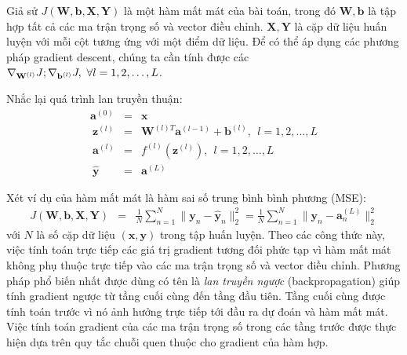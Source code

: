 

Giả sử $J(\mathbf{W, b, X, Y})$ là một hàm mất mát của bài toán, trong đó
$\mathbf{W, b}$ là tập hợp tất cả các ma trận trọng số và vector điều chỉnh. $\mathbf{X, Y}$ là cặp dữ liệu huấn luyện với mỗi cột
tương ứng với một điểm dữ liệu. Để có thể áp dụng các phương pháp gradient descent,
chúng ta cần tính được các
\begin{math}
\nabla_{\mathbf{W}^{(l)}}J; \nabla_{\mathbf{b}^{(l)}}J, ~\forall l = 1, 2, \dots, L
\end{math}.

Nhắc lại quá trình lan truyền thuận:
\begin{eqnarray}
\mathbf{a}^{(0)} &=& \mathbf{x} \\\
\mathbf{z}^{(l)}  &=& \mathbf{W}^{(l)T}\mathbf{a}^{(l-1)} + \mathbf{b}^{(l)},~~ l =  1, 2, \dots, L \\\
\mathbf{a}^{(l)} &=& f^{(l)}(\mathbf{z}^{(l)}), ~~ l =  1, 2, \dots, L \\\
\mathbf{\hat{y}} &=& \mathbf{a}^{(L)}
\end{eqnarray}


Xét ví dụ của hàm mất mát là hàm sai số trung bình bình phương (MSE):
\begin{eqnarray}
J(\mathbf{W, b, X, Y}) &=& \frac{1}{N}\sum_{n=1}^N \| \mathbf{y}_n - \mathbf{\hat{y}}_n\|_2^2
=\frac{1}{N}\sum_{n=1}^N \| \mathbf{y}_n - \mathbf{a}_n^{(L)}\|_2^2
\end{eqnarray}
với $N$ là số cặp dữ liệu $(\mathbf{x}, \mathbf{y})$ trong tập huấn luyện. Theo
các công thức này, việc tính toán trực tiếp các giá trị gradient tương đối phức
tạp vì hàm mất mát không phụ thuộc trực tiếp vào các ma trận trọng số và vector
điều chỉnh. Phương pháp phổ biến nhất được dùng có tên là \textit{lan truyền ngược}
(backpropagation) giúp tính gradient ngược từ tầng cuối cùng đến tầng đầu tiên.
Tầng cuối cùng được tính toán trước vì nó ảnh hưởng trực tiếp tới {đầu ra dự
đoán} và hàm mất mát. Việc tính toán gradient của các ma trận trọng số trong các
tầng trước được thực hiện dựa trên quy tắc chuỗi quen thuộc cho {gradient của hàm
hợp}.

